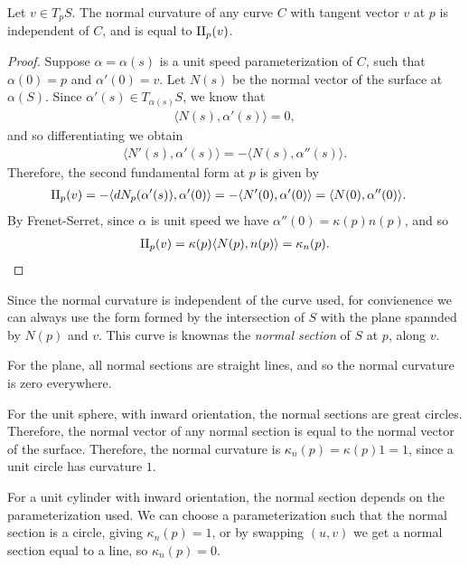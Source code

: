\begin{prop}
    Let $v \in T_pS$. The normal curvature of any curve $C$ with tangent vector $v$ at $p$ is independent of $C$, and is equal to $\operatorname{II}_p(v)$.
\end{prop}

\begin{proof}
    Suppose $\alpha = \alpha(s)$ is a unit speed parameterization of $C$, such that $\alpha(0) = p$ and $\alpha'(0) = v$. Let $N(s)$ be the normal vector of the surface at $\alpha(S)$. Since $\alpha'(s) \in T_{\alpha(s)}S$, we know that
    \begin{align*}
        \langle N(s), \alpha'(s)\rangle = 0,
    \end{align*}
    and so differentiating we obtain
    \begin{align*}
        \langle N'(s), \alpha'(s)\rangle = -\langle N(s), \alpha''(s)\rangle.
    \end{align*}
    Therefore, the second fundamental form at $p$ is given by
    \begin{align*}
        \operatorname{II}_{p}(v) &= -\langle dN_p(\alpha'(s)), \alpha'(0)\rangle = -\langle N'(0), \alpha'(0)\rangle = \langle N(0), \alpha''(0)\rangle.
    \end{align*}
    By Frenet-Serret, since $\alpha$ is unit speed we have $\alpha''(0) = \kappa(p)n(p)$, and so
    \begin{align*}
        \operatorname{II}_p(v) = \kappa(p)\langle N(p), n(p)\rangle = \kappa_n(p).
    \end{align*}
\end{proof}

\begin{rmk}
    Since the normal curvature is independent of the curve used, for convienence we can always use the form formed by the intersection of $S$ with the plane spannded by $N(p)$ and $v$. This curve is knownas the \emph{normal section} of $S$ at $p$, along $v$.
\end{rmk}

\begin{exmp}
    For the plane, all normal sections are straight lines, and so the normal curvature is zero everywhere.

    For the unit sphere, with inward orientation, the normal sections are great circles. Therefore, the normal vector of any normal section is equal to the normal vector of the surface. Therefore, the normal curvature is $\kappa_n(p) = \kappa(p)1 = 1$, since a unit circle has curvature $1$.

    For a unit cylinder with inward orientation, the normal section depends on the parameterization used. We can choose a parameterization such that the normal section is a circle, giving $\kappa_n(p) = 1$, or by swapping $(u, v)$ we get a normal section equal to a line, so $\kappa_n(p) = 0$.
\end{exmp}

